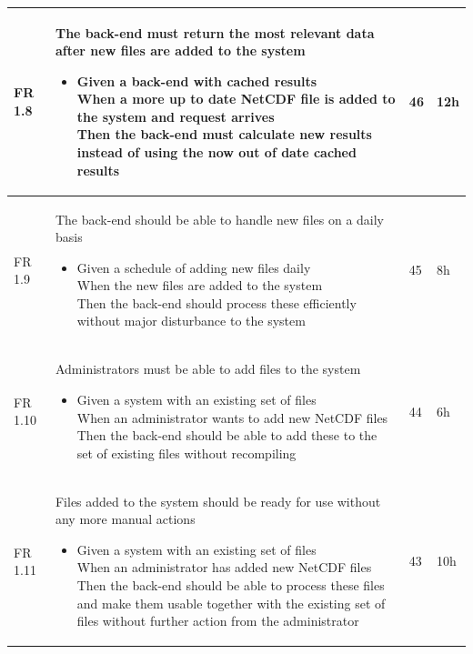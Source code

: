 \documentclass[11pt,a4paper,titlepage,oneside]{report}
\begin{document}
\begin{longtable}{p{1.4cm} p{7.8cm} p{1cm} p{1cm} }
  FR 1.8 & The back-end must return the most relevant data after new files are added to the system
  \begin{itemize}
  \item \parbox[t]{6.8cm}{
        Given a back-end with cached results \\
        When a more up to date NetCDF file is added to the system and request arrives \\
        Then the back-end must calculate new results instead of using the now out of date cached results}
  \end{itemize}
  & 46 & 12h \\ \hline

  FR 1.9 & The back-end should be able to handle new files on a daily basis
  \begin{itemize}
  \item \parbox[t]{6.8cm}{
        Given a schedule of adding new files daily \\
        When the new files are added to the system \\
        Then the back-end should process these efficiently without major disturbance to the system}
  \end{itemize}
  & 45 & 8h \\ \hline

  FR 1.10 & Administrators must be able to add files to the system
  \begin{itemize}
  \item \parbox[t]{6.8cm}{
        Given a system with an existing set of files \\
        When an administrator wants to add new NetCDF files \\
        Then the back-end should be able to add these to the set of existing files without recompiling}
  \end{itemize}
  & 44 & 6h \\ \hline

  FR 1.11 & Files added to the system should be ready for use without any more manual actions
  \begin{itemize}
  \item \parbox[t]{6.8cm}{
        Given a system with an existing set of files \\
        When an administrator has added new NetCDF files \\
        Then the back-end should be able to process these files and make them usable together with the existing set of files without further action from the administrator}
  \end{itemize}
  & 43 & 10h \\ \hline


\end{longtable}
\end{document}
